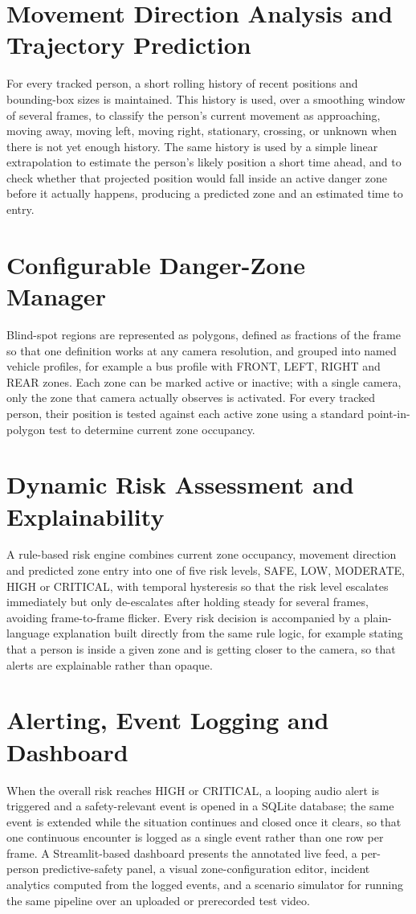 \documentclass[12pt,a4paper]{report}
\begin{document}
\section{Movement Direction Analysis and Trajectory Prediction}
For every tracked person, a short rolling history of recent positions and bounding-box sizes is maintained. This history is used, over a smoothing window of several frames, to classify the person's current movement as approaching, moving away, moving left, moving right, stationary, crossing, or unknown when there is not yet enough history. The same history is used by a simple linear extrapolation to estimate the person's likely position a short time ahead, and to check whether that projected position would fall inside an active danger zone before it actually happens, producing a predicted zone and an estimated time to entry.

\section{Configurable Danger-Zone Manager}
Blind-spot regions are represented as polygons, defined as fractions of the frame so that one definition works at any camera resolution, and grouped into named vehicle profiles, for example a bus profile with FRONT, LEFT, RIGHT and REAR zones. Each zone can be marked active or inactive; with a single camera, only the zone that camera actually observes is activated. For every tracked person, their position is tested against each active zone using a standard point-in-polygon test to determine current zone occupancy.

\section{Dynamic Risk Assessment and Explainability}
A rule-based risk engine combines current zone occupancy, movement direction and predicted zone entry into one of five risk levels, SAFE, LOW, MODERATE, HIGH or CRITICAL, with temporal hysteresis so that the risk level escalates immediately but only de-escalates after holding steady for several frames, avoiding frame-to-frame flicker. Every risk decision is accompanied by a plain-language explanation built directly from the same rule logic, for example stating that a person is inside a given zone and is getting closer to the camera, so that alerts are explainable rather than opaque.

\section{Alerting, Event Logging and Dashboard}
When the overall risk reaches HIGH or CRITICAL, a looping audio alert is triggered and a safety-relevant event is opened in a SQLite database; the same event is extended while the situation continues and closed once it clears, so that one continuous encounter is logged as a single event rather than one row per frame. A Streamlit-based dashboard presents the annotated live feed, a per-person predictive-safety panel, a visual zone-configuration editor, incident analytics computed from the logged events, and a scenario simulator for running the same pipeline over an uploaded or prerecorded test video.
\end{document}
